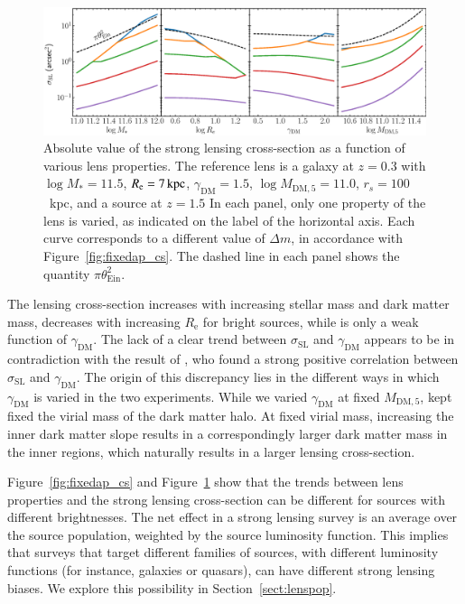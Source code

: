 \documentclass{aa}
\def\reff{R_{\mathrm{e}}}
\def\mstar{M_*}
\def\gammadm{\gamma_{\mathrm{DM}}}
\def\mdmfive{M_{\mathrm{DM}, 5}}
\def\tein{\theta_{\mathrm{Ein}}}
\def\crosssect{\sigma_\mathrm{{SL}}}
\def\Sref#1{Section~\ref{#1}\xspace}
\def\Fref#1{Figure~\ref{#1}\xspace}
\begin{document}
\begin{figure}
\includegraphics[width=\textwidth]{axisymm_composite_physical_crosssect.eps}
\caption{
Absolute value of the strong lensing cross-section as a function of various lens properties.
The reference lens is a galaxy at $z=0.3$ with $\log{\mstar}=11.5$, $\reff=7\,{\rm kpc}$, $\gammadm=1.5$, $\log{\mdmfive}=11.0$, $r_s=100$~kpc, and a source at $z=1.5$
In each panel, only one property of the lens is varied, as indicated on the label of the horizontal axis.
Each curve corresponds to a different value of $\Delta m$, in accordance with \Fref{fig:fixedap_cs}.
The dashed line in each panel shows the quantity $\pi\tein^2$.
\label{fig:phys_cs}
}
\end{figure}

The lensing cross-section increases with increasing stellar mass and dark matter mass, decreases with increasing $\reff$ for bright sources, while is only a weak function of $\gammadm$. 
The lack of a clear trend between $\crosssect$ and $\gammadm$ appears to be in contradiction with the result of \citet{MVK09}, who found a strong positive correlation between $\crosssect$ and $\gammadm$.
The origin of this discrepancy lies in the different ways in which $\gammadm$ is varied in the two experiments. While we varied $\gammadm$ at fixed $\mdmfive$, \citet{MVK09} kept fixed the virial mass of the dark matter halo. At fixed virial mass, increasing the inner dark matter slope results in a correspondingly larger dark matter mass in the inner regions, which naturally results in a larger lensing cross-section.

\Fref{fig:fixedap_cs} and \Fref{fig:phys_cs} show that the trends between lens properties and the strong lensing cross-section can be different for sources with different brightnesses.
The net effect in a strong lensing survey is an average over the source population, weighted by the source luminosity function. 
This implies that surveys that target different families of sources, with different luminosity functions (for instance, galaxies or quasars), can have different strong lensing biases. We explore this possibility in \Sref{sect:lenspop}.
\end{document}
